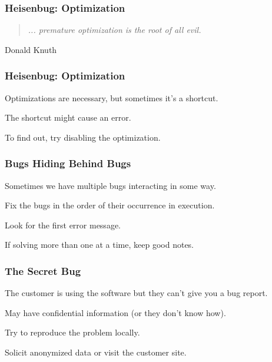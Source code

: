 \begin{frame}
\frametitle{Heisenbug: Optimization}
\begin{changemargin}{1cm}

\vspace{2em}
\begin{quote}
	\textit{... premature optimization is the root of all evil.}
\end{quote}
\hfill Donald Knuth


\end{changemargin}
\end{frame}

\begin{frame}
\frametitle{Heisenbug: Optimization}
\begin{changemargin}{1cm}

Optimizations are necessary, but sometimes it's a shortcut.

The shortcut might cause an error.

To find out, try disabling the optimization.

\end{changemargin}
\end{frame}

\begin{frame}
\frametitle{Bugs Hiding Behind Bugs}
\begin{changemargin}{1cm}

Sometimes we have multiple bugs interacting in some way.

Fix the bugs in the order of their occurrence in execution.

Look for the first error message.

If solving more than one at a time, keep good notes.


\end{changemargin}
\end{frame}


\begin{frame}
\frametitle{The Secret Bug}
\begin{changemargin}{1cm}

The customer is using the software but they can't give you a bug report.

May have confidential information (or they don't know how).

Try to reproduce the problem locally.

Solicit anonymized data or visit the customer site.

\end{changemargin}
\end{frame}

